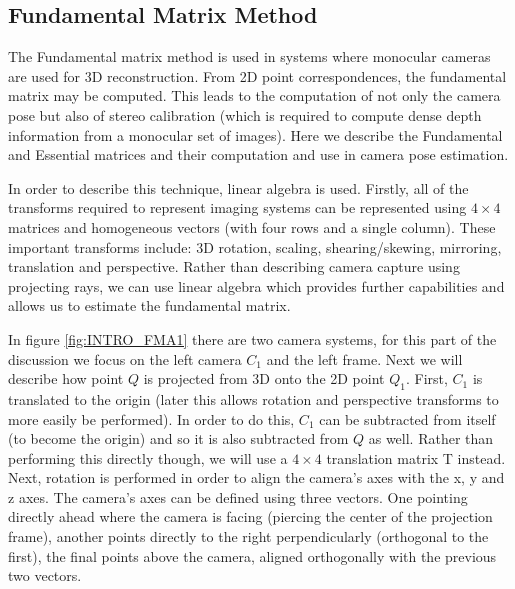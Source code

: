 \subsection{Fundamental Matrix Method}

\label{FundamentalMatrixSection}

The Fundamental matrix method is used in systems where monocular cameras are used for 3D reconstruction. From 2D point correspondences, the fundamental matrix may be computed. This leads to the computation of not only the camera pose but also of stereo calibration (which is required to compute dense depth information from a monocular set of images). Here we describe the Fundamental and Essential matrices and their computation and use in camera pose estimation.

In order to describe this technique, linear algebra is used. Firstly, all of the transforms required to represent imaging systems can be represented using $4 \times 4$ matrices and homogeneous vectors (with four rows and a single column). These important transforms include: 3D rotation, scaling, shearing/skewing, mirroring, translation and perspective. Rather than describing camera capture using projecting rays, we can use linear algebra which provides further capabilities and allows us to estimate the fundamental matrix. 

In figure \ref{fig:INTRO_FMA1} there are two camera systems, for this part of the discussion we focus on the left camera $C_{1}$ and the left frame. Next we will describe how point $Q$ is projected from 3D onto the 2D point $Q_{1}$. First, $C_{1}$ is translated to the origin (later this allows rotation and perspective transforms to more easily be performed). In order to do this, $C_{1}$ can be subtracted from itself (to become the origin) and so it is also subtracted from $Q$ as well. Rather than performing this directly though, we will use a $4 \times 4$ translation matrix T instead. Next, rotation is performed in order to align the camera's axes with the x, y and z axes. The camera's axes can be defined using three vectors. One pointing directly ahead where the camera is facing (piercing the center of the projection frame), another points directly to the right perpendicularly (orthogonal to the first), the final points above the camera, aligned orthogonally with the previous two vectors. \\


